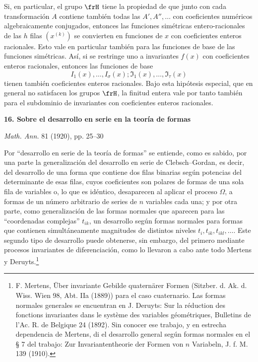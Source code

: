 \documentclass[11pt]{article}
\begin{document}
Si, en particular, el grupo \(\frH\) tiene la propiedad de que junto con cada transformación \(A\) contiene también todas las \(A',A'',\ldots\) con coeficientes numéricos algebraicamente conjugados, entonces las funciones simétricas entero-racionales de las \(h\) filas \((x^{(k)})\) se convierten en funciones de \(x\) con coeficientes enteros racionales. Esto vale en particular también para las funciones de base de las funciones simétricas. Así, si se restringe uno a invariantes \(f(x)\) con coeficientes enteros racionales, entonces las funciones de base
\[
        I_1(x),\ldots,I_\sigma(x);\mathfrak I_1(x),\ldots,\mathfrak I_\tau(x)
\]
tienen también coeficientes enteros racionales. Bajo esta hipótesis especial, que en general no satisfacen los grupos \(\frH\), la finitud entera vale por tanto también para el subdominio de invariantes con coeficientes enteros racionales.





\clearpage
\begin{center}
{\Large\bfseries 16. Sobre el desarrollo en serie en la teoría de formas}\par
\vspace{1em}
\emph{Math. Ann.} 81 (1920), pp. 25--30
\end{center}

Por ``desarrollo en serie de la teoría de formas'' se entiende, como es sabido, por una parte la generalización del desarrollo en serie de Clebsch--Gordan, es decir, del desarrollo de una forma que contiene dos filas binarias según potencias del determinante de esas filas, cuyos coeficientes son polares de formas de una sola fila de variables o, lo que es idéntico, desaparecen al aplicar el proceso \(\Omega\), a formas de un número arbitrario de series de \(n\) variables cada una; y por otra parte, como generalización de las formas normales que aparecen para las ``coordenadas complejas'' \(t_{ik}\), un desarrollo según formas normales para formas que contienen simultáneamente magnitudes de distintos niveles \(t_i,t_{ik},t_{ikl},\ldots\). Este segundo tipo de desarrollo puede obtenerse, sin embargo, del primero mediante procesos invariantes de diferenciación, como lo llevaron a cabo ante todo Mertens y Deruyts.\footnote{F. Mertens, Über invariante Gebilde quaternärer Formen (Sitzber. d. Ak. d. Wiss. Wien 98, Abt. IIa (1889)) para el caso cuaternario. Las formas normales generales se encuentran en J. Deruyts: Sur la réduction des fonctions invariantes dans le système des variables géométriques, Bulletins de l'Ac. R. de Belgique 24 (1892). Sin conocer ese trabajo, y en estrecha dependencia de Mertens, di el desarrollo general según formas normales en el § 7 del trabajo: Zur Invariantentheorie der Formen von \(n\) Variabeln, J. f. M. 139 (1910).}
\end{document}
